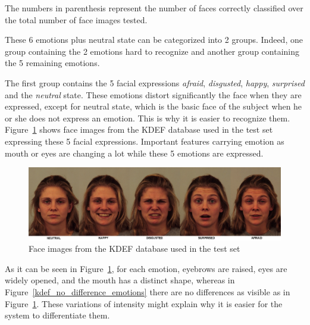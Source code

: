 \noindent The numbers in parenthesis represent the number of faces correctly classified over the total number of face images tested.
\newline

\noindent These 6 emotions plus neutral state can be categorized into 2 groups. Indeed, one group containing the 2 emotions hard to recognize and another group containing the 5 remaining emotions.
\newline

\noindent The first group contains the 5 facial expressions \textit{afraid}, \textit{disgusted}, \textit{happy}, \textit{surprised} and the \textit{neutral} state. These emotions distort significantly the face when they are expressed, except for neutral state, which is the basic face of the subject when he or she does not express an emotion. This is why it is easier to recognize them. Figure~\ref{kdef_difference_emotions} shows face images from the KDEF database used in the test set expressing these 5 facial expressions. Important features carrying emotion as mouth or eyes are changing a lot while these 5 emotions are expressed.
\newline

\begin{figure}[!h]
\begin{center}
\noindent \includegraphics[scale=0.3]{figures/kdef_difference_emotions} 
\newline
\caption{Face images from the KDEF database used in the test set}
\label{kdef_difference_emotions}
\end{center} 
\end{figure}

\noindent As it can be seen in Figure~\ref{kdef_difference_emotions}, for each emotion, eyebrows are raised, eyes are widely opened, and the mouth has a distinct shape, whereas in Figure~\ref{kdef_no_difference_emotions} there are no differences as visible as in Figure~\ref{kdef_difference_emotions}. These variations of intensity might explain why it is easier for the system to differentiate them.
\newline


